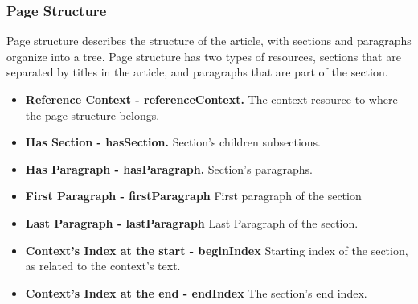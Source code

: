 \documentclass[thesis=M,english,hidelinks]{FITthesis}[2019/12/23]
\begin{document}
\subsubsection{Page Structure}

Page structure describes the structure of the article, with sections and paragraphs organize into a tree. Page structure has two types of resources, sections that are separated by titles in the article, and paragraphs that are part of the section.

\begin{itemize}
	\item \textbf{Reference Context - referenceContext.} The context resource to where the page structure belongs.
	\item \textbf{Has Section - hasSection.} Section's children subsections.
	\item \textbf{Has Paragraph - hasParagraph.} Section's paragraphs.
	\item \textbf{First Paragraph - firstParagraph} First paragraph of the section
	\item \textbf{Last Paragraph - lastParagraph} Last Paragraph of the section.
	\item \textbf{Context's Index at the start - beginIndex} Starting index of the section, as related to the context's text.
	\item \textbf{Context's Index at the end - endIndex} The section's end index.
\end{itemize}
\end{document}
